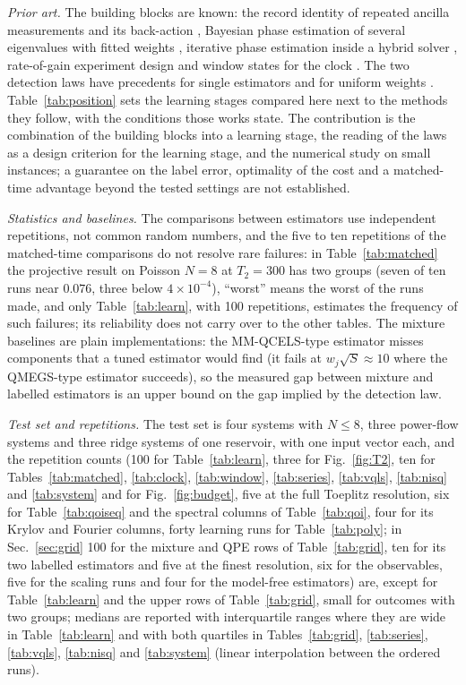 \documentclass[journal]{IEEEtran}
\begin{document}
\emph{Prior art.} The building blocks are known: the record identity of repeated ancilla measurements \cite{OBrien2019} and its back-action \cite{Jin2023}, Bayesian phase estimation of several eigenvalues with fitted weights \cite{vandenBerg2021}, iterative phase estimation inside a hybrid solver \cite{Gao2021}, rate-of-gain experiment design \cite{deNeeve2025,McMichael2021} and window states for the clock \cite{HHL2009,Rendon2022,Patel2026,Kristjuhan2026}. The two detection laws have precedents for single estimators and for uniform weights \cite{OBrien2019,QMEGS2024,Izumi2026}. Table~\ref{tab:position} sets the learning stages compared here next to the methods they follow, with the conditions those works state. The contribution is the combination of the building blocks into a learning stage, the reading of the laws as a design criterion for the learning stage, and the numerical study on small instances; a guarantee on the label error, optimality of the cost and a matched-time advantage beyond the tested settings are not established.

\emph{Statistics and baselines.} The comparisons between estimators use independent repetitions, not common random numbers, and the five to ten repetitions of the matched-time comparisons do not resolve rare failures: in Table~\ref{tab:matched} the projective result on Poisson $N=8$ at $T_2=300$ has two groups (seven of ten runs near $0.076$, three below $4\times10^{-4}$), ``worst'' means the worst of the runs made, and only Table~\ref{tab:learn}, with 100 repetitions, estimates the frequency of such failures; its reliability does not carry over to the other tables. The mixture baselines are plain implementations: the MM-QCELS-type estimator misses components that a tuned estimator would find (it fails at $w_j\sqrt S\approx10$ where the QMEGS-type estimator succeeds), so the measured gap between mixture and labelled estimators is an upper bound on the gap implied by the detection law.

\emph{Test set and repetitions.} The test set is four systems with $N\le8$, three power-flow systems and three ridge systems of one reservoir, with one input vector each, and the repetition counts (100 for Table~\ref{tab:learn}, three for Fig.~\ref{fig:T2}, ten for Tables~\ref{tab:matched}, \ref{tab:clock}, \ref{tab:window}, \ref{tab:series}, \ref{tab:vqls}, \ref{tab:nisq} and \ref{tab:system} and for Fig.~\ref{fig:budget}, five at the full Toeplitz resolution, six for Table~\ref{tab:qoiseq} and the spectral columns of Table~\ref{tab:qoi}, four for its Krylov and Fourier columns, forty learning runs for Table~\ref{tab:poly}; in Sec.~\ref{sec:grid} 100 for the mixture and QPE rows of Table~\ref{tab:grid}, ten for its two labelled estimators and five at the finest resolution, six for the observables, five for the scaling runs and four for the model-free estimators) are, except for Table~\ref{tab:learn} and the upper rows of Table~\ref{tab:grid}, small for outcomes with two groups; medians are reported with interquartile ranges where they are wide in Table~\ref{tab:learn} and with both quartiles in Tables~\ref{tab:grid}, \ref{tab:series}, \ref{tab:vqls}, \ref{tab:nisq} and \ref{tab:system} (linear interpolation between the ordered runs).
\end{document}
